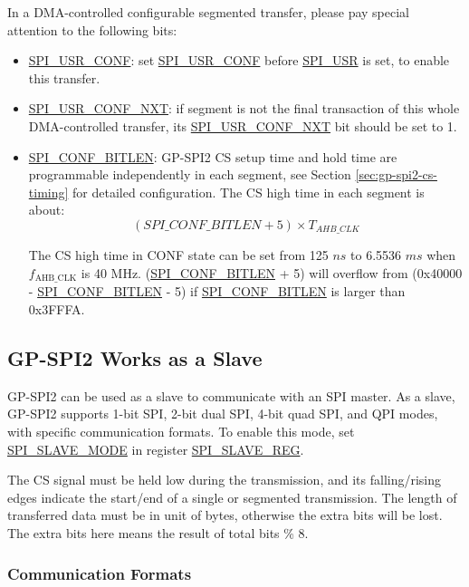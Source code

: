 \documentclass[main\_\_EN.tex]{subfiles}
\begin{document}
In a DMA-controlled configurable segmented transfer, please pay special attention to the following bits:
\begin{itemize}
    \item \hyperref[fielddesc:SPIUSRCONF]{SPI\_USR\_CONF}: set \hyperref[fielddesc:SPIUSRCONF]{SPI\_USR\_CONF} before \hyperref[fielddesc:SPIUSR]{SPI\_USR} is set, to enable this transfer.
    \item \hyperref[fielddesc:SPIUSRCONFNXT]{SPI\_USR\_CONF\_NXT}: if segment is not the final transaction of this whole DMA-controlled transfer, its \hyperref[fielddesc:SPIUSRCONFNXT]{SPI\_USR\_CONF\_NXT} bit should be set to 1.
    \item \hyperref[fielddesc:SPICONFBITLEN]{SPI\_CONF\_BITLEN}: GP-SPI2 CS setup time and hold time are programmable independently in each segment, see Section \ref{sec:gp-spi2-cs-timing} for detailed configuration. The CS high time in each segment is about:
    \[
    (\hyperref[fielddesc:SPICONFBITLEN]{SPI\_CONF\_BITLEN} + 5) \times T_{AHB\_CLK}
    \]

The CS high time in CONF state can be set from 125 $ns$ to 6.5536 $ms$ when $f_{\textrm{AHB\_CLK}}$ is 40 MHz.
(\hyperref[fielddesc:SPICONFBITLEN]{SPI\_CONF\_BITLEN} + 5) will overflow from (0x40000 - \hyperref[fielddesc:SPICONFBITLEN]{SPI\_CONF\_BITLEN} - 5) if \hyperref[fielddesc:SPICONFBITLEN]{SPI\_CONF\_BITLEN} is larger than 0x3FFFA.
\end{itemize}

\subsection{GP-SPI2 Works as a Slave}\label{sec:gp-spi2-slave-mode}

GP-SPI2 can be used as a slave to communicate with an SPI master. As a slave, GP-SPI2 supports 1-bit SPI, 2-bit dual SPI, 4-bit quad SPI, and QPI modes, with specific communication formats. To enable this mode, set \hyperref[fielddesc:SPISLAVEMODE]{SPI\_SLAVE\_MODE} in register \hyperref[regdesc:SPISLAVEREG]{SPI\_SLAVE\_REG}.

The CS signal must be held low during the transmission, and its falling/rising edges indicate the start/end of a single or segmented transmission. The length of transferred data must be in unit of bytes, otherwise the extra bits will be lost. The extra bits here means the result of total bits \% 8.

\subsubsection{Communication Formats}\label{slave communication format}
\end{document}
